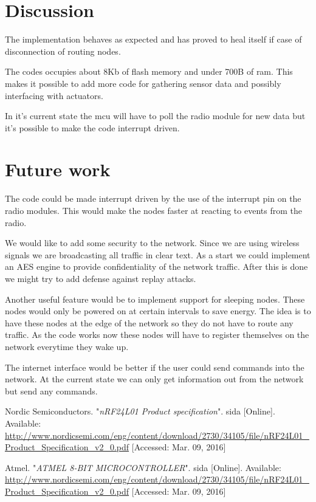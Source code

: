 \documentclass[a4paper,11pt]{article}
\begin{document}
\section{Discussion}
The implementation behaves as expected and has proved to heal itself
if case of disconnection of routing nodes. 

The codes occupies about 8Kb of flash memory and under 700B of
ram. This makes it possible to add more code for gathering sensor data
and possibly interfacing with actuators. 

In it's current state the mcu will have to poll the radio module for
new data but it's possible to make the code interrupt driven.

\section{Future work}
The code could be made interrupt driven by the use of the interrupt 
pin on the radio modules. This would make the nodes faster at reacting
to events from the radio. 

We would like to add some security to the network. Since we are using
wireless signals we are broadcasting all traffic in clear text. As a 
start we could implement an AES engine to provide confidentiality of  
the network traffic. After this is done we might try to add defense against 
replay attacks. 

Another useful feature would be to implement support for sleeping 
nodes. These nodes would only be powered on at certain intervals to
save energy. The idea is to have these nodes at the edge of the 
network so they do not have to route any traffic. As the code works
now these nodes will have to register themselves on the network
everytime they wake up. 

The internet interface would be better if the user could send commands
into the network. At the current state we can only get information out
from the network but send any commands.

\begin{thebibliography}{2}

  Nordic Semiconductors. "\emph{nRF24L01 Product specification}". sida [Online]. Available: \url{http://www.nordicsemi.com/eng/content/download/2730/34105/file/nRF24L01_Product_Specification_v2_0.pdf} [Accessed: Mar. 09, 2016]

  Atmel. "\emph{ATMEL 8-BIT MICROCONTROLLER}". sida [Online]. Available: \url{http://www.nordicsemi.com/eng/content/download/2730/34105/file/nRF24L01_Product_Specification_v2_0.pdf} [Accessed: Mar. 09, 2016]

\end{thebibliography}
\end{document}

